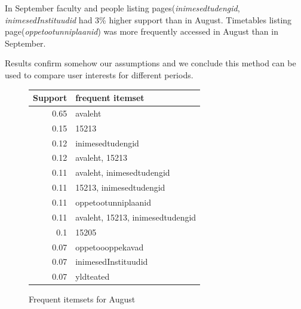 \documentclass[12pt, english,a4paper]{article}
\begin{document}
In September faculty and people listing pages(\emph{inimesedtudengid}, \emph{inimesedInstituudid}  had 3\% higher support than in August. Timetables listing page(\emph{oppetootunniplaanid})  was more frequently accessed in August than in September.

Results confirm somehow our assumptions and we conclude this method can be used to compare user interests for different periods.


\begin{figure}[H]
  \centering
\begin{tabular}{ r | l }
Support & frequent itemset \\ \hline
0.65 & avaleht \\ \hline
0.15 & 15213 \\ \hline
0.12 & inimesedtudengid \\ \hline
0.12 & avaleht, 15213 \\ \hline
0.11 & avaleht, inimesedtudengid \\ \hline
0.11 & 15213, inimesedtudengid \\ \hline
0.11 & oppetootunniplaanid \\ \hline
0.11 & avaleht, 15213, inimesedtudengid \\ \hline
0.1 & 15205 \\ \hline
0.07 & oppetoooppekavad \\ \hline
0.07 & inimesedInstituudid \\ \hline
0.07 & yldteated \\ \hline
\end{tabular}
  \caption{Frequent itemsets for August }
  \label{aug2}
\end{figure}
\end{document}
